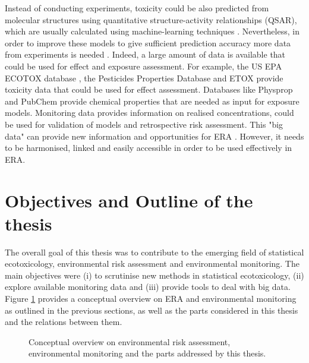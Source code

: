 Instead of conducting experiments, toxicity could be also predicted from molecular structures using quantitative structure-activity relationships (QSAR), which are usually calculated using machine-learning techniques \citep{murrell_chemically_2015, cortes-ciriano_bioalerts:_2016}. 
Nevertheless, in order to improve these models to give sufficient prediction accuracy more data from experiments is needed \citep{kuhne_read-across_2013}. 
Indeed, a large amount of data is available that could be used for effect and exposure assessment. 
For example, the US EPA ECOTOX database \citep{u.s._epa_ecotoxicology_2016}, the Pesticides Properties Database \citep{lewis_international_2016} and ETOX \citep{umweltbundesamt_etox:_2016} provide toxicity data that could be used for effect assessment.
Databases like Physprop \citep{howard_physical_2016} and PubChem \citep{kim_pubchem_2016} provide chemical properties that are needed as input for exposure models.
Monitoring data provides information on realised concentrations, could be used for validation of models and retrospective risk assessment.
This "big data" can provide new information and opportunities for ERA \citep{dafforn_big_2015}. 
However, it needs to be harmonised, linked and easily accessible in order to be used effectively in ERA.



\newpage
\section{Objectives and Outline of the thesis}

The overall goal of this thesis was to contribute to the emerging field of statistical ecotoxicology, environmental risk assessment and environmental monitoring.
The main objectives were (i) to scrutinise new methods in statistical ecotoxicology,
(ii) explore available monitoring data and
(iii) provide tools to deal with big data.
Figure \ref{fig:intro:overview} provides a conceptual overview on ERA and environmental monitoring as outlined in the previous sections, as well as the parts considered in this thesis and the relations between them. 

\begin{figure}[h]
	\vspace{1em}
    \hspace*{-1cm} 
	\resizebox{1.1\textwidth}{!}{%
		
	}
	\caption[Conceptual overview of the topics addressed by this thesis]{Conceptual overview on environmental risk assessment, environmental monitoring and the parts addressed by this thesis.}
	\label{fig:intro:overview}
\end{figure}

